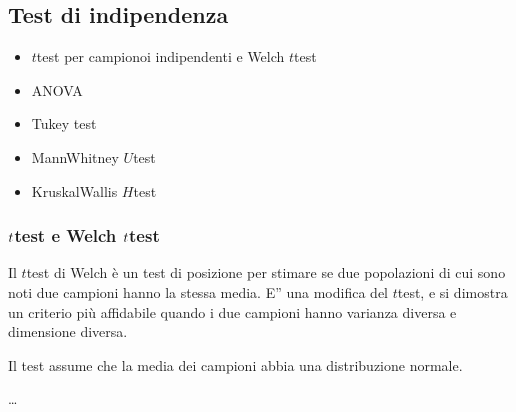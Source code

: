 \documentclass[letterpaper,10pt,italian]{jupyterBook}
\begin{document}
\subsection{Test di indipendenza}
\label{\detokenize{ch/statistics/hp-test-independence:test-di-indipendenza}}\label{\detokenize{ch/statistics/hp-test-independence:hp-test-independence}}\label{\detokenize{ch/statistics/hp-test-independence::doc}}
\sphinxAtStartPar
{}
\begin{itemize}
\item {} 
\sphinxAtStartPar
\(t\)\sphinxhyphen{}test per campionoi indipendenti e Welch \(t\)\sphinxhyphen{}test

\item {} 
\sphinxAtStartPar
ANOVA

\item {} 
\sphinxAtStartPar
Tukey test

\item {} 
\sphinxAtStartPar
Mann\sphinxhyphen{}Whitney \(U\)\sphinxhyphen{}test

\item {} 
\sphinxAtStartPar
Kruskal\sphinxhyphen{}Wallis \(H\)\sphinxhyphen{}test

\end{itemize}


\subsubsection{\protect\(t\protect\)\sphinxhyphen{}test e Welch \protect\(t\protect\)\sphinxhyphen{}test}
\label{\detokenize{ch/statistics/hp-test-independence:t-test-e-welch-t-test}}\label{\detokenize{ch/statistics/hp-test-independence:hp-test-independence-t-welch}}
\sphinxAtStartPar
Il \(t\)\sphinxhyphen{}test di Welch è un test di posizione per stimare se due popolazioni di cui sono noti due campioni hanno la stessa media. E” una modifica del \(t\)\sphinxhyphen{}test, e si dimostra un criterio più affidabile quando i due campioni hanno varianza diversa e dimensione diversa.

\sphinxAtStartPar
{} Il test assume che la media dei campioni abbia una distribuzione normale.

\sphinxAtStartPar
…
\end{document}
